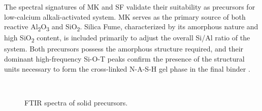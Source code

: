  The spectral signatures of MK and SF validate their suitability as precursors for low-calcium alkali-activated system. MK serves as the primary source of both reactive Al\textsubscript{2}O\textsubscript{3} and SiO\textsubscript{2}.
 Silica Fume, characterized by its amorphous nature and high SiO\textsubscript{2} content, is included primarily to adjust the overall Si/Al ratio of the system.
 Both precursors possess the amorphous structure required, and their dominant high-frequency Si-O-T peaks confirm the presence of the structural units necessary to form the cross-linked N-A-S-H gel phase in the final binder \cite{Provis2014_LowCa}.

\begin{figure}[H]
    \centering
     \\
    \caption{FTIR spectra of solid precursors.}
    \label{fig:ftir_precursors}
\end{figure}


